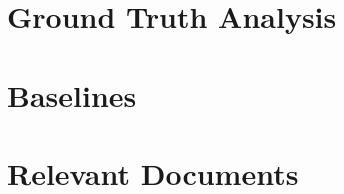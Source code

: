 \documentclass[titlepage]{article}
\begin{document}
\section{Ground Truth Analysis}

\section{Baselines}

\section{Relevant Documents}
\end{document}
